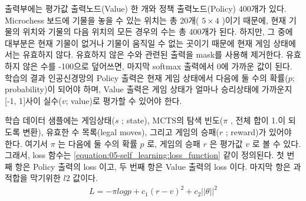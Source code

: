 \documentclass[letterpaper,10pt,english]{sphinxmanual}
\begin{document}
출력부에는 평가값 출력노드(Value) 한 개와 정책 출력노드(Policy) 400개가 있다.
Microchess 보드에 기물을 놓을 수 있는 위치는 총 20개( \(5 \times 4\) )이기 때문에,
현재 기물의 위치와 기물의 다음 위치의 모든 경우의 수는 총 400개가 된다.
하지만, 그 중에 대부분은 현재 기물이 없거나 기물이 움직일 수 없는 곳이기 때문에 현재 게임 상태에서는 유효하지 않다.
유효하지 않은 수와 관련된 출력을 mask를 사용해 제거한다. 유효하지 않은 수를 -100으로 덮어쓰면,
마지막 softmax 출력에서 0에 가까운 값이 된다.
학습의 결과 인공신경망의 Policy 출력은 현재 게임 상태에서 다음에 둘 수의 확률(\(p\); probability)이 되어야 하며,
Value 출력은 게임 상태가 얼마나 승리상태에 가까운지 {[}-1, 1{]}사이 실수(\(v\); value)로 평가할 수 있어야 한다.

학습 데이터 샘플에는 게임상태(\(s\) ; state), MCTS의 탐색 빈도(\(\pi\) , 전체 합이 1.이 되도록 변환),
유효한 수 목록(legal moves), 그리고 게임의 승패(\(r\) ; reward)가 있어야 한다.
여기서 \(\pi\) 는 다음에 둘 수의 확률 \(p\) 로, 게임의 승패 \(r\) 은 평가값 \(v\) 로 볼 수 있다.
그래서, loss 함수는 \eqref{equation:05-self_learning:loss_function} 같이 정의된다.
첫 번째 항은 Policy 출력의 loss 이고, 두 번째 항은 Value 출력의 loss 이다. 마지막 항은 과적합을 막기위한 \(l2\) 값이다.
\begin{equation}\label{equation:05-self_learning:loss_function}
\begin{split}L =  - \pi log p + c_1 (r - v)^2  + c_2 ||\theta||^2\end{split}
\end{equation}
\def\sphinxLiteralBlockLabel{\label{\detokenize{05-self_learning:training-code}}\label{\detokenize{05-self_learning:id11}}}
%
\end{document}

